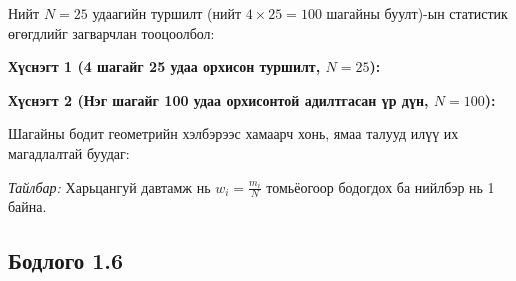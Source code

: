 \documentclass[11pt,a4paper]{article}
\begin{document}
Нийт $N = 25$ удаагийн туршилт (нийт $4 \times 25 = 100$ шагайны буулт)-ын статистик өгөгдлийг загварчлан тооцоолбол:

\textbf{Хүснэгт 1 (4 шагайг 25 удаа орхисон туршилт, $N=25$):}
\begin{center}
\small
{}
\end{center}

\textbf{Хүснэгт 2 (Нэг шагайг 100 удаа орхисонтой адилтгасан үр дүн, $N=100$):}

Шагайны бодит геометрийн хэлбэрээс хамаарч хонь, ямаа талууд илүү их магадлалтай буудаг:
\begin{center}
\small
{}
\end{center}

\textit{Тайлбар:} Харьцангуй давтамж нь $w_i = \frac{m_i}{N}$ томьёогоор бодогдох ба нийлбэр нь 1 байна.

\vspace{0.8em}

\subsection*{Бодлого 1.6}
\end{document}
